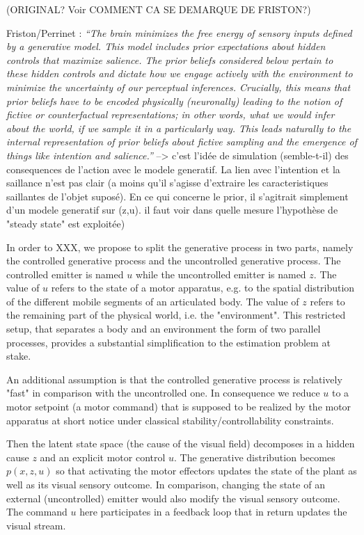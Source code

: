 \documentclass[12pt,twoside,openright]{article}
\begin{document}
	{\color{blue} (ORIGINAL? Voir COMMENT CA SE DEMARQUE DE FRISTON?) 
		
	Friston/Perrinet : \emph{``The brain minimizes the free energy of sensory inputs defined by a generative model. This model includes prior expectations about hidden controls that maximize salience.	 
	The prior beliefs considered below pertain to these hidden controls and dictate how we engage actively with the environment to minimize the uncertainty of our perceptual inferences. Crucially, this means that prior beliefs have to be encoded physically (neuronally) leading to the notion of fictive or counterfactual representations; in other words, what we would infer about the world, if we sample it in a particularly way. This leads naturally to the internal representation of prior beliefs about fictive sampling and the emergence of things like intention and salience.''} --> c'est l'idée de simulation (semble-t-il) des consequences de l'action avec le modele generatif. La lien avec l'intention et la saillance n'est pas clair (a moins qu'il s'agisse d'extraire les caracteristiques saillantes de l'objet suposé). En ce qui concerne le prior, il s'agitrait simplement d'un modele generatif sur (z,u). il faut voir dans quelle mesure l'hypothèse de "steady state" est exploitée)
		
	In order to XXX, we propose to split the generative process in two parts, namely the controlled generative process and the uncontrolled generative process. The controlled emitter is named $u$ while the uncontrolled emitter is named $z$. The value of $u$ refers to the state of a motor apparatus, e.g. to the spatial distribution of the different mobile segments of an articulated body. The value of $z$ refers to the remaining part of the physical world, i.e. the "environment". This restricted setup, that separates a body and an environment the form of two parallel processes,  provides a substantial simplification to the estimation problem at stake.  	
	
	An additional assumption is that the controlled generative process is relatively "fast" in comparison with the uncontrolled one. In consequence we reduce $u$ to  a motor setpoint (a motor command) that is supposed to be realized by the motor apparatus at short notice under classical stability/controllability constraints.
	

	
	Then the latent state space (the cause of the visual field) decomposes in a hidden cause $z$ and an explicit motor control $u$. The generative distribution becomes $p(x, z, u)$ so that activating the motor effectors updates the state of the plant as well as its visual sensory outcome. In comparison,  changing the state of an external (uncontrolled) emitter would also modify the visual sensory outcome. The command $u$ here participates in a feedback loop that in return updates the visual stream.
		
}
\end{document}
